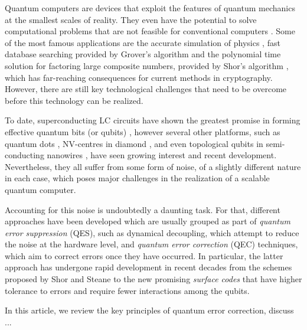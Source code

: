 Quantum computers are devices that exploit the features of quantum mechanics at
the smallest scales of reality. They even have the potential to solve
computational problems that are not feasible for conventional computers
\cite{nielsen_chuang_2010}. Some of the most famous applications are the
accurate simulation of physics \cite{feynman82_simul_physic_with_comput}, fast
database searching provided by Grover's algorithm \cite{Grover_1996} and the
polynomial time solution for factoring large composite numbers, provided by
Shor's algorithm \cite{Shor_1997}, which has far-reaching consequences for
current methods in cryptography. However, there are still key technological
challenges that need to be overcome before this technology can be realized.

To date, superconducting LC circuits have shown the greatest promise in forming
effective quantum bits (or qubits) \cite{Rol_2019}
\cite{barends14_super_quant_circuit_at_surfac}, however several other platforms,
such as quantum dots \cite{huang19_fidel_bench_two_qubit_gates_silic}
\cite{Lawrie_2020}, NV-centres in diamond \cite{Taminiau_2014}, and even
topological qubits in semi-conducting nanowires \cite{Mourik_2012}, have seen
growing interest and recent development. Nevertheless, they all suffer from some
form of noise, of a slightly different nature in each case, which poses
major challenges in the realization of a scalable quantum computer.

Accounting for this noise is undoubtedly a daunting task. For that, different
approaches have been developed which are usually grouped as part of
\textit{quantum error suppression} (QES), such as dynamical decoupling, which
attempt to reduce the noise at the hardware level, and \textit{quantum error
  correction} (QEC) techniques, which aim to correct errors once they have
occurred. In particular, the latter approach has undergone rapid development in
recent decades from the schemes proposed by Shor \cite{Shor_1995_QEC} and Steane
\cite{Steane_1996_QEC} to the new promising \textit{surface codes}
\cite{fowler12_surfac_codes} that have higher tolerance to errors and require
fewer interactions among the qubits.

In this article, we review the key principles of quantum error correction,
discuss ...




